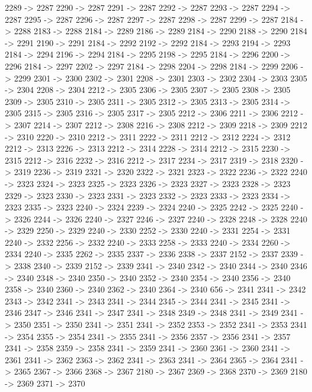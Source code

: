{	2289 -> 2287
	2290 -> 2287
	2291 -> 2287
	2292 -> 2287
	2293 -> 2287
	2294 -> 2287
	2295 -> 2287
	2296 -> 2287
	2297 -> 2287
	2298 -> 2287
	2299 -> 2287
	2184 -> 2288
	2183 -> 2288
	2184 -> 2289
	2186 -> 2289
	2184 -> 2290
	2188 -> 2290
	2184 -> 2291
	2190 -> 2291
	2184 -> 2292
	2192 -> 2292
	2184 -> 2293
	2194 -> 2293
	2184 -> 2294
	2196 -> 2294
	2184 -> 2295
	2198 -> 2295
	2184 -> 2296
	2200 -> 2296
	2184 -> 2297
	2202 -> 2297
	2184 -> 2298
	2204 -> 2298
	2184 -> 2299
	2206 -> 2299
	2301 -> 2300
	2302 -> 2301
	2208 -> 2301
	2303 -> 2302
	2304 -> 2303
	2305 -> 2304
	2208 -> 2304
	2212 -> 2305
	2306 -> 2305
	2307 -> 2305
	2308 -> 2305
	2309 -> 2305
	2310 -> 2305
	2311 -> 2305
	2312 -> 2305
	2313 -> 2305
	2314 -> 2305
	2315 -> 2305
	2316 -> 2305
	2317 -> 2305
	2212 -> 2306
	2211 -> 2306
	2212 -> 2307
	2214 -> 2307
	2212 -> 2308
	2216 -> 2308
	2212 -> 2309
	2218 -> 2309
	2212 -> 2310
	2220 -> 2310
	2212 -> 2311
	2222 -> 2311
	2212 -> 2312
	2224 -> 2312
	2212 -> 2313
	2226 -> 2313
	2212 -> 2314
	2228 -> 2314
	2212 -> 2315
	2230 -> 2315
	2212 -> 2316
	2232 -> 2316
	2212 -> 2317
	2234 -> 2317
	2319 -> 2318
	2320 -> 2319
	2236 -> 2319
	2321 -> 2320
	2322 -> 2321
	2323 -> 2322
	2236 -> 2322
	2240 -> 2323
	2324 -> 2323
	2325 -> 2323
	2326 -> 2323
	2327 -> 2323
	2328 -> 2323
	2329 -> 2323
	2330 -> 2323
	2331 -> 2323
	2332 -> 2323
	2333 -> 2323
	2334 -> 2323
	2335 -> 2323
	2240 -> 2324
	2239 -> 2324
	2240 -> 2325
	2242 -> 2325
	2240 -> 2326
	2244 -> 2326
	2240 -> 2327
	2246 -> 2327
	2240 -> 2328
	2248 -> 2328
	2240 -> 2329
	2250 -> 2329
	2240 -> 2330
	2252 -> 2330
	2240 -> 2331
	2254 -> 2331
	2240 -> 2332
	2256 -> 2332
	2240 -> 2333
	2258 -> 2333
	2240 -> 2334
	2260 -> 2334
	2240 -> 2335
	2262 -> 2335
	2337 -> 2336
	2338 -> 2337
	2152 -> 2337
	2339 -> 2338
	2340 -> 2339
	2152 -> 2339
	2341 -> 2340
	2342 -> 2340
	2344 -> 2340
	2346 -> 2340
	2348 -> 2340
	2350 -> 2340
	2352 -> 2340
	2354 -> 2340
	2356 -> 2340
	2358 -> 2340
	2360 -> 2340
	2362 -> 2340
	2364 -> 2340
	656 -> 2341
	2341 -> 2342
	2343 -> 2342
	2341 -> 2343
	2341 -> 2344
	2345 -> 2344
	2341 -> 2345
	2341 -> 2346
	2347 -> 2346
	2341 -> 2347
	2341 -> 2348
	2349 -> 2348
	2341 -> 2349
	2341 -> 2350
	2351 -> 2350
	2341 -> 2351
	2341 -> 2352
	2353 -> 2352
	2341 -> 2353
	2341 -> 2354
	2355 -> 2354
	2341 -> 2355
	2341 -> 2356
	2357 -> 2356
	2341 -> 2357
	2341 -> 2358
	2359 -> 2358
	2341 -> 2359
	2341 -> 2360
	2361 -> 2360
	2341 -> 2361
	2341 -> 2362
	2363 -> 2362
	2341 -> 2363
	2341 -> 2364
	2365 -> 2364
	2341 -> 2365
	2367 -> 2366
	2368 -> 2367
	2180 -> 2367
	2369 -> 2368
	2370 -> 2369
	2180 -> 2369
	2371 -> 2370
}
